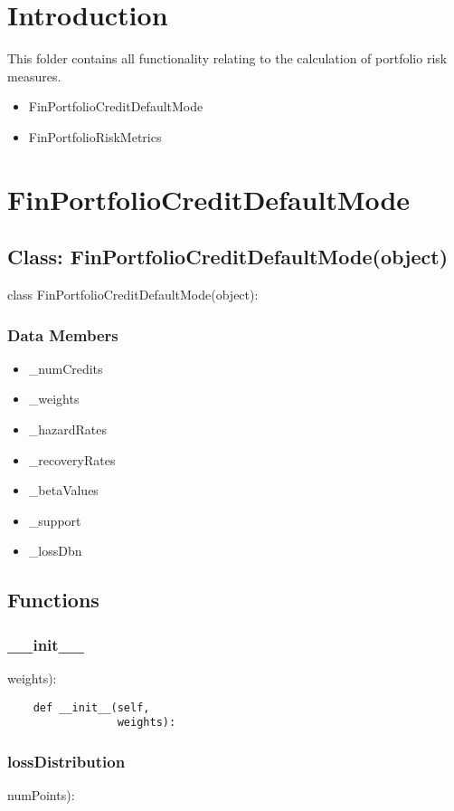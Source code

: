 \documentclass[twoside,11pt]{book}
\begin{document}
\section{Introduction}

This folder contains all functionality relating to the calculation of portfolio risk measures.
\begin{itemize}
\item{ FinPortfolioCreditDefaultMode
}
\item{ FinPortfolioRiskMetrics
}
\end{itemize}
\newpage
\section{FinPortfolioCreditDefaultMode}

\subsection*{Class: FinPortfolioCreditDefaultMode(object)}
class FinPortfolioCreditDefaultMode(object): 

\subsubsection*{Data Members}
\begin{itemize}
\item{\_numCredits}
\item{\_weights}
\item{\_hazardRates}
\item{\_recoveryRates}
\item{\_betaValues}
\item{\_support}
\item{\_lossDbn}
\end{itemize}

\subsection*{Functions}

\subsubsection*{{\bf \_\_init\_\_}}
weights): 

\begin{lstlisting}
    def __init__(self,
                 weights):
\end{lstlisting}

\subsubsection*{{\bf lossDistribution}}
numPoints): 
\end{document}
